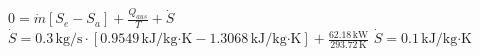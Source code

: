 \( 0 = \dot{m} [S_e - S_a] + \frac{Q_{aus}}{T} + \dot{S} \)  
\( \dot{S} = 0.3 \, \text{kg/s} \cdot [0.9549 \, \text{kJ/kg·K} - 1.3068 \, \text{kJ/kg·K}] + \frac{62.18 \, \text{kW}}{293.72 \, \text{K}} \)  
\( \dot{S} = 0.1 \, \text{kJ/kg·K} \)